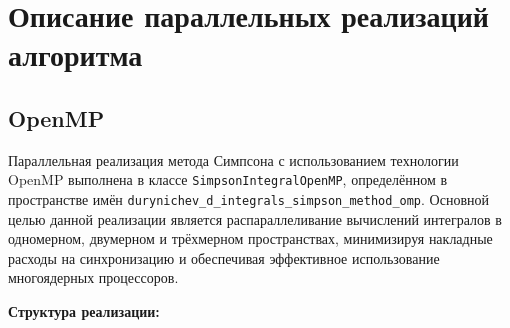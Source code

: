 \documentclass[12pt]{article}
\begin{document}
\section{Описание параллельных реализаций алгоритма}

\subsection{OpenMP}

Параллельная реализация метода Симпсона с использованием технологии OpenMP выполнена в классе \texttt{SimpsonIntegralOpenMP}, определённом в пространстве имён \texttt{durynichev\_d\_integrals\_simpson\_method\_omp}. Основной целью данной реализации является распараллеливание вычислений интегралов в одномерном, двумерном и трёхмерном пространствах, минимизируя накладные расходы на синхронизацию и обеспечивая эффективное использование многоядерных процессоров.

\textbf{Структура реализации:}
\end{document}
